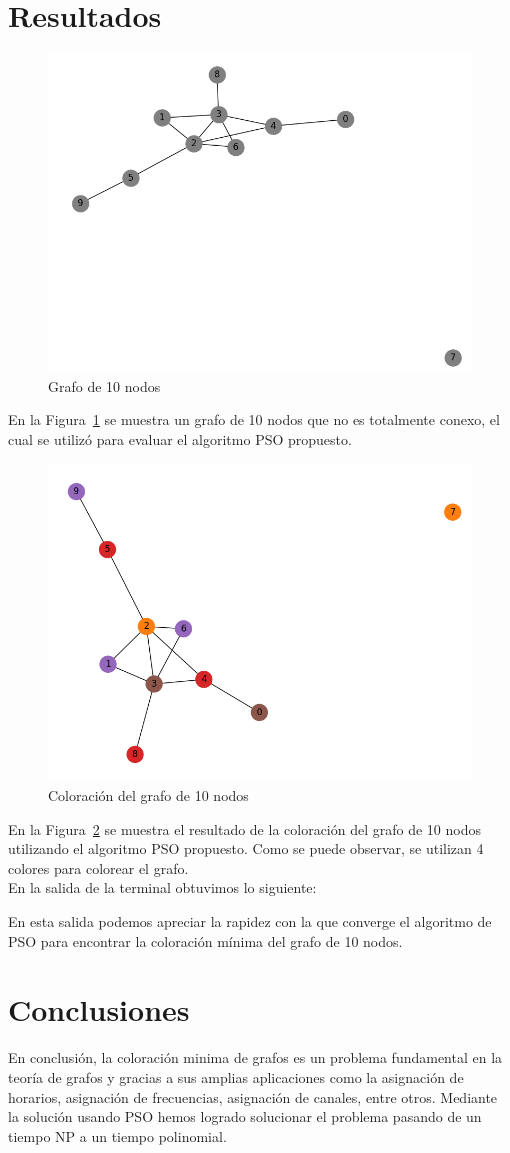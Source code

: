 \documentclass[9pt,a4paper,twoside]{tau-class/tau}
\begin{document}
\section{Resultados}
    \begin{figure}[H]
        \centering
        \includegraphics[width=0.5\columnwidth]{MCGP/graph.png}
        \caption{Grafo de 10 nodos}
        \label{fig:graph}
    \end{figure}
    En la Figura~\ref*{fig:graph} se muestra un grafo de 10 nodos que no es totalmente conexo, el cual 
    se utilizó para evaluar el algoritmo PSO propuesto.
    \begin{figure}[H]
        \centering
        \includegraphics[width=0.5\columnwidth]{MCGP/graphColored.png}
        \caption{Coloración del grafo de 10 nodos}
        \label{fig:graphColored}
    \end{figure}
    En la Figura~\ref*{fig:graphColored} se muestra el resultado de la coloración del grafo de 10 nodos utilizando el algoritmo PSO propuesto.
    Como se puede observar, se utilizan 4 colores para colorear el grafo. \\ 
    En la salida de la terminal obtuvimos lo siguiente:
    
    En esta salida podemos apreciar la rapidez con la que converge el algoritmo de PSO
    para encontrar la coloración mínima del grafo de 10 nodos.

\section{Conclusiones}
    En conclusión, la coloración minima de grafos es un problema fundamental en la teoría de grafos y gracias a sus amplias aplicaciones como
    la asignación de horarios, asignación de frecuencias, asignación de canales, entre otros. Mediante la solución usando PSO hemos logrado solucionar el problema pasando de un tiempo NP 
    a un tiempo polinomial. 

\printbibliography
\end{document}
